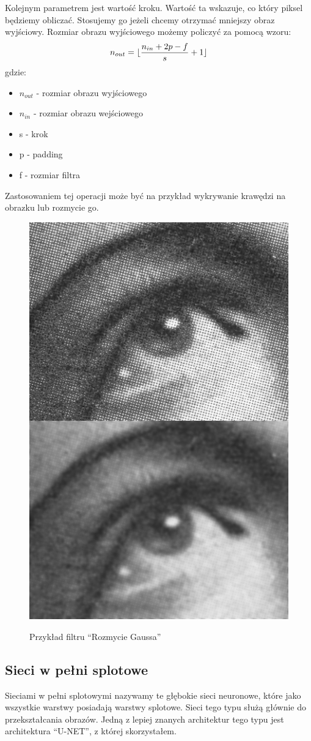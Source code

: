 \documentclass{article}
\DeclarePairedDelimiter\floor{\lfloor}{\rfloor}
\begin{document}
Kolejnym parametrem jest wartość kroku. Wartość ta wskazuje, co który piksel będziemy obliczać.
Stosujemy go jeżeli chcemy otrzymać mniejszy obraz wyjściowy.
Rozmiar obrazu wyjściowego możemy policzyć za pomocą wzoru:
\begin{align*}
    n_{out} = \floor{\frac{n_{in}+2p-f}{s}+1}
\end{align*}
gdzie:
\begin{itemize}
    \item $n_{out}$ - rozmiar obrazu wyjściowego
    \item $n_{in}$ - rozmiar obrazu wejściowego
    \item s - krok
    \item p - padding
    \item f - rozmiar filtra
\end{itemize}

Zastosowaniem tej operacji może być na przykład wykrywanie krawędzi na obrazku lub rozmycie go.

\begin{figure}[H]
    \centering
    \includegraphics[width=\linewidth,height=\linewidth]{images/cnn_blur.jpg}
    \caption{Przykład filtru ``Rozmycie Gaussa''}
    \cite{cnn_blur}
\end{figure}

\subsection{Sieci w pełni splotowe}
Sieciami w pełni splotowymi nazywamy te głębokie sieci neuronowe, które jako wszystkie warstwy posiadają warstwy splotowe.
Sieci tego typu służą głównie do przekształcania obrazów.
Jedną z lepiej znanych architektur tego typu jest architektura ``U-NET'', z której skorzystałem.
\newpage
\end{document}

